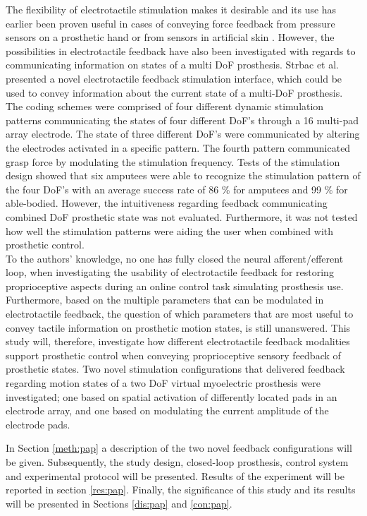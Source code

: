 %
The flexibility of electrotactile stimulation makes it desirable and its use has earlier been proven useful in cases of conveying force feedback from pressure sensors on a prosthetic hand or from sensors in artificial skin \cite{Hartmann2014,Franceschi2015}. However, the possibilities in electrotactile feedback have also been investigated with regards to communicating information on states of a multi DoF prosthesis. Strbac et al. \cite{Strbac2016} presented a novel electrotactile feedback stimulation interface, which could be used to convey information about the current state of a multi-DoF prosthesis. The coding schemes were comprised of four different dynamic stimulation patterns communicating the states of four different DoF's through a 16 multi-pad array electrode. The state of three different DoF's were communicated by altering the electrodes activated in a specific pattern. The fourth pattern communicated grasp force by modulating the stimulation frequency. Tests of the stimulation design showed that six amputees were able to recognize the stimulation pattern of the four DoF's with an average success rate of 86 \% for amputees and 99 \% for able-bodied. \cite{Strbac2016} However, the intuitiveness regarding feedback communicating combined DoF prosthetic state was not evaluated. Furthermore, it was not tested how well the stimulation patterns were aiding the user when combined with prosthetic control.  \\   
%
To the authors' knowledge, no one has fully closed the neural afferent/efferent loop, when investigating the usability of electrotactile feedback for restoring proprioceptive aspects during an online control task simulating prosthesis use. Furthermore, based on the multiple parameters that can be modulated in electrotactile feedback, the question of which parameters that are most useful to convey tactile information on prosthetic motion states, is still unanswered. This study will, therefore, investigate how different electrotactile feedback modalities support prosthetic control when conveying proprioceptive sensory feedback of prosthetic states. Two novel stimulation configurations that delivered feedback regarding motion states of a two DoF virtual myoelectric prosthesis were investigated; one based on spatial activation of differently located pads in an electrode array, and one based on modulating the current amplitude of the electrode pads.

In Section \ref{meth:pap} a description of the two novel feedback configurations will be given. Subsequently, the study design, closed-loop prosthesis, control system and experimental protocol will be presented. Results of the experiment will be reported in section \ref{res:pap}. Finally, the significance of this study and its results will be presented in Sections \ref{dis:pap} and \ref{con:pap}. 
















